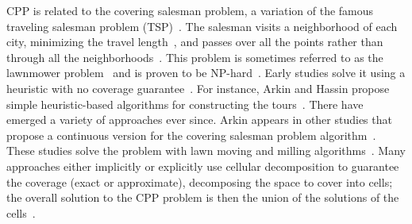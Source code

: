 CPP is related to the covering salesman problem, a variation of the famous traveling salesman problem (TSP)~\citep{arkin1994approximation}. The salesman visits a neighborhood of each city, minimizing the travel length~\citep{arkin1994approximation}, and passes over all the points rather than through all the neighborhoods~\citep{choset2001coverage}. This problem is sometimes referred to as the lawnmower problem~\citep{galceran2013survey} and is proven to be NP-hard~\citep{arkin2000approximation}. Early studies solve it using a heuristic with no coverage guarantee~\citep{choset2001coverage}. For instance, Arkin and Hassin propose simple heuristic-based algorithms for constructing the tours~\citep{arkin1994approximation}. There have emerged a variety of approaches ever since. Arkin appears in other studies that propose a continuous version for the covering salesman problem algorithm~\citep{arkin1993lawnmower,fekete1994lawnmower,arkin2000approximation}. These studies solve the problem with lawn moving and milling algorithms~\citep{arkin2000approximation}. Many approaches either implicitly or explicitly use cellular decomposition to guarantee the coverage (exact or approximate), decomposing the space to cover into cells; the overall solution to the CPP problem is then the union of the solutions of the cells~\citep{choset2001coverage}. 

